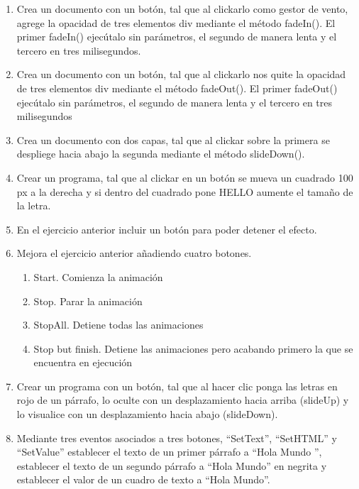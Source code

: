 \documentclass[a4paper, oneside]{article}
\begin{document}
\begin{enumerate}
\item Crea un documento con un botón, tal que al clickarlo como gestor de vento, agrege la opacidad de tres elementos div mediante el método fadeIn(). El primer fadeIn() ejecútalo sin parámetros, el segundo de manera lenta y el tercero en tres milisegundos.

\item Crea un documento con un botón, tal que al clickarlo nos quite la opacidad de tres elementos div mediante el método fadeOut(). El primer fadeOut() ejecútalo sin parámetros, el segundo de manera lenta y el tercero en tres milisegundos

\item Crea un documento con dos capas, tal que al clickar sobre la primera se despliege hacia abajo la segunda mediante el método slideDown().

\item Crear un programa, tal que al clickar en un botón se mueva un cuadrado 100 px a la derecha y si dentro del cuadrado pone HELLO aumente el tamaño de la letra.

\item En el ejercicio anterior incluir un botón para poder detener el efecto.

\item Mejora el ejercicio anterior añadiendo cuatro botones.

\begin{enumerate}
\item Start. Comienza la animación

\item Stop. Parar la animación

\item StopAll. Detiene todas las animaciones

\item Stop but finish. Detiene las animaciones pero acabando primero la que se encuentra en ejecución
\end{enumerate}

\item Crear un programa con un botón, tal que al hacer clic ponga las letras en rojo de un párrafo, lo oculte con un desplazamiento hacia arriba (slideUp) y lo visualice con un desplazamiento hacia abajo (slideDown).

\item Mediante tres eventos asociados a tres botones, “SetText”, “SetHTML” y “SetValue” establecer el texto de un primer párrafo a “Hola Mundo ”, establecer el texto de un segundo  párrafo a “Hola Mundo” en negrita y establecer el valor de un cuadro de texto a “Hola Mundo”.


\end{enumerate}
\end{document}
